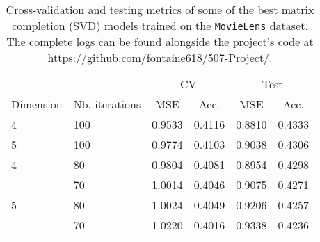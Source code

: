 \begin{table}
\centering
\begin{tabular}{llcccc}
\toprule
  &     &   \multicolumn{2}{c}{CV} & \multicolumn{2}{c}{Test}\\
  \cmidrule(lr){3-4}\cmidrule(lr){5-6}
Dimension & Nb. iterations &        MSE & Acc. & MSE & Acc.  \\
\midrule
4 & 100 &  0.9533 &      0.4116 &   0.8810 &        0.4333 \\
5 & 100 &  0.9774 &      0.4103 &   0.9038 &        0.4306 \\
4 & 80  &  0.9804 &      0.4081 &   0.8954 &        0.4298 \\
  & 70  &  1.0014 &      0.4046 &   0.9075 &        0.4271 \\
5 & 80  &  1.0024 &      0.4049 &   0.9206 &        0.4257 \\
  & 70  &  1.0220 &      0.4016 &   0.9338 &        0.4236 \\
\bottomrule
\end{tabular}
\caption{Cross-validation and testing metrics of some of the best matrix completion (SVD) models trained on the \texttt{MovieLens} dataset. The complete logs can be found alongside the project's code at \url{https://github.com/fontaine618/507-Project/}.}
\label{tab:results.svd}
\end{table}
